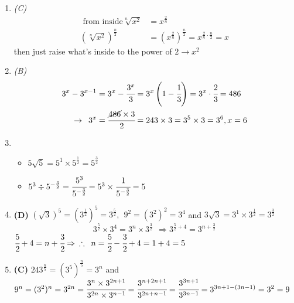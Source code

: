 \begin{multicols}{2}
\begin{enumerate}[label={\arabic*.}]
    \item \textit{(C)}
    \begin{align*} 
    \text{ from inside}  \sqrt[n]{x^2} &= x^{\frac{2}{n}} \\
    (\sqrt[n]{x^2})^{\frac{n}{2}} & = (x^{\frac{2}{n}})^{\frac{n}{2}} = x^{\frac{2}{n} \cdot \frac{n}{2}} = x 
    \end{align*}
    then just raise what's inside to the power of $2 \rightarrow x^2$
    \item \textit{(B)} \begin{align*} 
        3^x - 3^{x-1} &= 3^x -\cfrac{3^x}{3} = 3^x\left(1- \cfrac{1}{3}\right) =3^x \cdot \cfrac{2}{3} =  486 \\ \rightarrow \hspace{5pt}  3^x &=  \cfrac{\cancel{486}\times 3}{2} = 243 \times 3 = 3^5 \times 3 = 3^6, x = 6
    \end{align*}
    \item
    \begin{itemize} 
    \item $5\sqrt{5} = 5^1 \times 5^{\frac{1}{2}} = 5^{\frac{3}{2}}$
    \item $5^3 \divisionsymbol 5^{-\frac{3}{2}} = \cfrac{5^3}{5^{-\frac{3}{2}}} = 5^3 \times \cfrac{1}{5^{-\frac{3}{2}}} = 5$
    \end{itemize}

    \item \textbf{(D)} $(\sqrt{3})^5 = (3^{\frac{1}{2}})^5 = 3^{\frac{5}{2}}, \hspace{5pt} 9^2 =(3^2)^2 = 3^4  $ and $3\sqrt{3} = 3^1 \times 3^{\frac{1}{2}} = 3^{\frac{3}{2}}$ \\
     $$3^{\frac{5}{2}} \times 3^4 = 3^n \times 3^{\frac{3}{2}}\hspace{5pt} \Rightarrow 3^{\frac{5}{2} + 4} = 3^{n + \frac{3}{2}} $$ 
     $ \cfrac{5}{2} + 4 = n + \cfrac{3}{2} \Rightarrow \hspace{5pt} \therefore \hspace{5pt} n = \cfrac{5}{2} - \cfrac{3}{2} + 4 = 1 + 4 = 5  $
    \item \textbf{(C)} $243^{\frac{n}{5}} = (3^5)^{\frac{n}{5}} = 3^n$ and $9^n = (3^2)^n = 3^{2n} = \cfrac{3^n \times 3^{2n + 1}}{3^{2n} \times 3^{n-1}} = \cfrac{3^{n + 2n + 1}}{3^{2n + n -1}} = \cfrac{3^{3n + 1}}{3^{3n - 1}} = 3^{3n + 1 - (3n - 1)} = 3^2 = 9 $


\end{enumerate}
\end{multicols}
